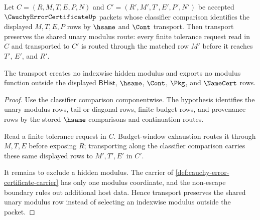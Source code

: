\begin{theorem}
\label{thm:cauchy-error-certificate-shared-modulus-transport}
Let $C=(R,M,T,E,P,N)$ and $C'=(R',M',T',E',P',N')$ be accepted $\CauchyErrorCertificateUp$ packets whose classifier comparison identifies the displayed $M,T,E,P$ rows by $\hsame$ and $\Cont$ transport. Then transport preserves the shared unary modulus route: every finite tolerance request read in $C$ and transported to $C'$ is routed through the matched row $M'$ before it reaches $T'$, $E'$, and $R'$.

The transport creates no indexwise hidden modulus and exports no modulus function outside the displayed $\mathsf{BHist}$, $\hsame$, $\Cont$, $\Pkg$, and $\NameCert$ rows.
\end{theorem}
\begin{proof}
Use the classifier comparison componentwise. The hypothesis identifies the unary modulus rows, tail or diagonal rows, finite budget rows, and provenance rows by the stored $\hsame$ comparisons and continuation routes.

Read a finite tolerance request in $C$. Budget-window exhaustion routes it through $M,T,E$ before exposing $R$; transporting along the classifier comparison carries these same displayed rows to $M',T',E'$ in $C'$.

It remains to exclude a hidden modulus. The carrier of \autoref{def:cauchy-error-certificate-carrier} has only one modulus coordinate, and the non-escape boundary rules out additional host data. Hence transport preserves the shared unary modulus row instead of selecting an indexwise modulus outside the packet.
\end{proof}

